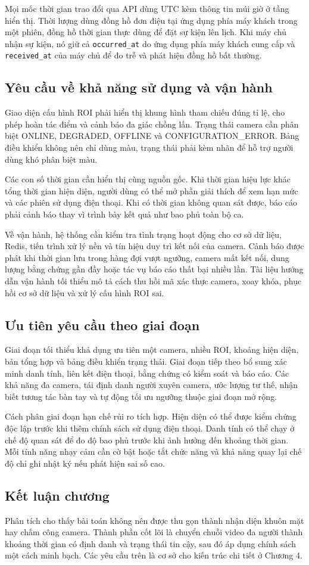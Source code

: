 Mọi mốc thời gian trao đổi qua API dùng UTC kèm thông tin múi giờ ở tầng hiển thị. Thời lượng dùng đồng hồ đơn điệu tại ứng dụng phía máy khách trong một phiên, đồng hồ thời gian thực dùng để đặt sự kiện lên lịch. Khi máy chủ nhận sự kiện, nó giữ cả \texttt{occurred\_at} do ứng dụng phía máy khách cung cấp và \texttt{received\_at} của máy chủ để đo trễ và phát hiện đồng hồ bất thường.

\subsection{Yêu cầu về khả năng sử dụng và vận hành}
Giao diện cấu hình ROI phải hiển thị khung hình tham chiếu đúng tỉ lệ, cho phép hoàn tác điểm và cảnh báo đa giác chồng lấn. Trạng thái camera cần phân biệt ONLINE, DEGRADED, OFFLINE và CONFIGURATION\_ERROR. Bảng điều khiển không nên chỉ dùng màu, trạng thái phải kèm nhãn để hỗ trợ người dùng khó phân biệt màu.

Các con số thời gian cần hiển thị cùng nguồn gốc. Khi thời gian hiệu lực khác tổng thời gian hiện diện, người dùng có thể mở phần giải thích để xem hạn mức và các phiên sử dụng điện thoại. Khi có thời gian không quan sát được, báo cáo phải cảnh báo thay vì trình bày kết quả như bao phủ toàn bộ ca.

Về vận hành, hệ thống cần kiểm tra tình trạng hoạt động cho cơ sở dữ liệu, Redis, tiến trình xử lý nền và tín hiệu duy trì kết nối của camera. Cảnh báo được phát khi thời gian lưu trong hàng đợi vượt ngưỡng, camera mất kết nối, dung lượng bằng chứng gần đầy hoặc tác vụ báo cáo thất bại nhiều lần. Tài liệu hướng dẫn vận hành tối thiểu mô tả cách thu hồi mã xác thực camera, xoay khóa, phục hồi cơ sở dữ liệu và xử lý cấu hình ROI sai.

\subsection{Ưu tiên yêu cầu theo giai đoạn}
Giai đoạn tối thiểu khả dụng ưu tiên một camera, nhiều ROI, khoảng hiện diện, bản tổng hợp và bảng điều khiển trạng thái. Giai đoạn tiếp theo bổ sung xác minh danh tính, liên kết điện thoại, bằng chứng có kiểm soát và báo cáo. Các khả năng đa camera, tái định danh người xuyên camera, ước lượng tư thế, nhận biết tương tác bàn tay và tự động tối ưu ngưỡng thuộc giai đoạn mở rộng.

Cách phân giai đoạn hạn chế rủi ro tích hợp. Hiện diện có thể được kiểm chứng độc lập trước khi thêm chính sách sử dụng điện thoại. Danh tính có thể chạy ở chế độ quan sát để đo độ bao phủ trước khi ảnh hưởng đến khoảng thời gian. Mỗi tính năng nhạy cảm cần cờ bật hoặc tắt chức năng và khả năng quay lại chế độ chỉ ghi nhật ký nếu phát hiện sai số cao.

\subsection{Kết luận chương}
Phân tích cho thấy bài toán không nên được thu gọn thành nhận diện khuôn mặt hay chấm công camera. Thành phần cốt lõi là chuyển chuỗi video đa người thành khoảng thời gian có định danh và trạng thái tin cậy, sau đó áp dụng chính sách một cách minh bạch. Các yêu cầu trên là cơ sở cho kiến trúc chi tiết ở Chương 4.
